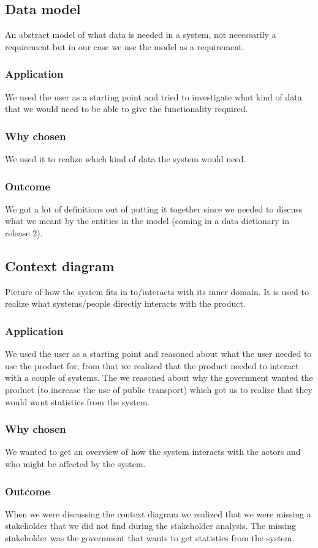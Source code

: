 \documentclass[a4paper]{article}
\begin{document}
    \subsection{Data model}
	An abstract model of what data is needed in a system, not necessarily a requirement but in our case we use the model as a requirement.	
    \subsubsection{Application}
    We used the user as a starting point and tried to investigate what kind of data that we would need to be able to give the functionality required.
    \subsubsection{Why chosen}
    We used it to realize which kind of data the system would need.
    \subsubsection{Outcome}
	We got a lot of definitions out of putting it together since we needed to discuss what we meant by the entities in the model (coming in a data dictionary in release 2).



    \subsection{Context diagram}
	Picture of how the system fits in to/interacts with its inner domain. It is used to realize what systems/people directly interacts with the product.
    \subsubsection{Application}
    We used the user as a starting point and reasoned about what the user needed to use the product for, from that we realized that the product needed to interact with a couple of systems. The we reasoned about why the government wanted the product (to increase the use of public transport) which got us to realize that they would want statistics from the system.
    \subsubsection{Why chosen}
    We wanted to get an overview of how the system interacts with the actors and who might be affected by the system.
    \subsubsection{Outcome}
	When we were discussing the context diagram we realized that we were missing a stakeholder that we did not find during the stakeholder analysis. The missing stakeholder was the government that wants to get statistics from the system. 
\end{document}
